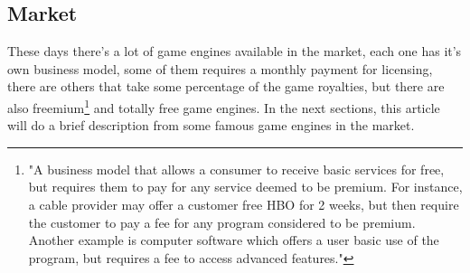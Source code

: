 \subsection{Market}
These days there's a lot of game engines available in the market, each one has it's own business model, some of them requires a monthly payment for licensing, there are others that take some percentage of the game royalties, but there are also freemium\footnote{"A business model that allows a consumer to receive basic services for free, but requires them to pay for any service deemed to be premium. For instance, a cable provider may offer a customer free HBO for 2 weeks, but then require the customer to pay a fee for any program considered to be premium. Another example is computer software which offers a user basic use of the program, but requires a fee to access advanced features."\cite{Freemium}} and totally free game engines. In the next sections, this article will do a brief description from some famous game engines in the market.







